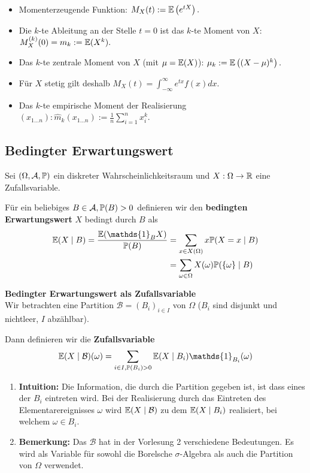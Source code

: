 \begin{subbox}{}
    \begin{itemize}
        \item Momenterzeugende Funktion: $M_X(t):=\mathbb{E}\left(e^{tX}\right).$ 
        \item Die $k$-te Ableitung an der Stelle $t = 0$ ist das $k$-te Moment von $X$: $M_X^{(k)}(0) = m_k := \mathbb{E}(X^k).$ 
        \item Das $k$-te zentrale Moment von $X$ (mit $\mu = \mathbb{E}(X)$): $\mu_k := \mathbb{E}\left((X-\mu)^k\right).$ 
        \item Für $X$ stetig gilt deshalb $M_X(t) = \int_{-\infty}^\infty e^{tx} f(x) dx.$ 
        \item Das $k$-te empirische Moment der Realisierung $(x_{1\dots n}): \hat m_k(x_{1\dots n}) := \frac1n \sum_{i=1}^n x_i^k.$ 
    \end{itemize}
    
\end{subbox}

\subsection{Bedingter Erwartungswert}
Sei $(\Omega, \mathcal{A}, \mathbb{P})$ ein diskreter Wahrscheinlichkeitsraum und $X:\Omega \to \mathbb{R}$ eine Zufallsvariable. 

Für ein beliebiges $B \in \mathcal{A}, \mathbb{P}(B) > 0$ definieren wir den \textbf{bedingten Erwartungswert} $X$ bedingt durch $B$ als
\begin{align*}
    \E(X \mid B) = \frac{\E(\mathds{1}_B X)}{\P(B)} &= \sum_{x \in X(\Omega)}x\P(X = x\mid B)\\ 
    &= \sum_{\omega \in \Omega}X(\omega)\P(\{\omega\}\mid B)
\end{align*}

\textbf{Bedingter Erwartungswert als Zufallsvariable}\\
Wir betrachten eine Partition $\mathcal{B} = (B_i)_{i \in I}$ von $\Omega$ ($B_i$ sind disjunkt und nichtleer, $I$ abzählbar). 

Dann definieren wir die \textbf{Zufallsvariable}
$$\E(X \mid \mathcal{B})(\omega) = \sum_{i \in I, \P(B_i) > 0} \E(X \mid B_i) \mathds{1}_{B_i}(\omega)$$ 
\begin{enumerate}
    \item \textbf{Intuition:} Die Information, die durch die Partition gegeben ist, ist dass eines der $B_i$ eintreten wird. Bei der Realisierung durch das Eintreten des Elementarereignisses $\omega$ wird $\mathbb{E}(X \mid \mathcal{B})$ zu dem $\mathbb{E}(X \mid B_i)$ realisiert, bei welchem $\omega \in B_i$.
    \item \textbf{Bemerkung:} Das $\mathcal{B}$ hat in der Vorlesung 2 verschiedene Bedeutungen. Es wird als Variable für sowohl die Borelsche $\sigma$-Algebra als auch die Partition von $\Omega$ verwendet.
\end{enumerate}


